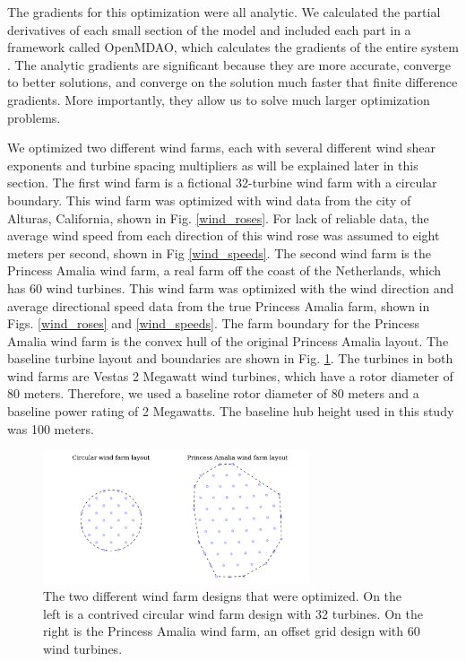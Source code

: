         The gradients for this optimization were all analytic. We calculated the partial derivatives of each small section of the model and included each part in a framework called OpenMDAO, which calculates the gradients of the entire system \citep{gray2010openmdao}. The analytic gradients are significant because they are more accurate, converge to better solutions, and converge on the solution much faster that finite difference gradients. More importantly, they allow us to solve much larger optimization problems. %
        
We optimized two different wind farms, each with several different wind shear exponents and turbine spacing multipliers as will be explained later in this section. 
The first wind farm is a fictional 32-turbine wind farm with a circular boundary. %
This wind farm was optimized with wind data from the city of Alturas, California, shown in Fig. \ref{wind_roses}.  For lack of reliable data, the average wind speed from each direction of this wind rose was assumed to eight meters per second, shown in Fig \ref{wind_speeds}.
The second wind farm is the Princess Amalia wind farm, a real farm off the coast of the Netherlands, which has 60 wind turbines. This wind farm was optimized with the wind direction and average directional speed data from the true Princess Amalia farm, shown in Figs. \ref{wind_roses} and \ref{wind_speeds}. The farm boundary for the Princess Amalia wind farm is the convex hull of the original Princess Amalia layout. The baseline turbine layout and boundaries are shown in Fig. \ref{layouts}. The turbines in both wind farms are Vestas 2 Megawatt wind turbines, which have a rotor diameter of 80 meters. Therefore, we used a baseline rotor diameter of 80 meters and a baseline power rating of 2 Megawatts. The baseline hub height used in this study was 100 meters. 

\begin{figure}[htbp]
  \centering
   \includegraphics[width=0.7\textwidth]{Figures/baseline_layouts.pdf}
  \caption{\label{layouts} The two different wind farm designs that were optimized. On the left is a contrived circular wind farm design with 32 turbines. On the right is the Princess Amalia wind farm, an offset grid design with 60 wind turbines. }
\end{figure}

